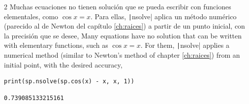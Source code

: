 \begin{paracol}{2}
Muchas ecuaciones no tienen solución que se pueda escribir con funciones elementales, como $\cos x = x$. Para ellas, \texttt|nsolve| aplica un método numérico (parecido al de Newton del capítulo \ref{ch:raices}) a partir de un punto inicial, con la precisión que se desee,
\switchcolumn
Many equations have no solution that can be written with elementary functions, such as $\cos x = x$. For them, \texttt|nsolve| applies a numerical method (similar to Newton's method of chapter \ref{ch:raices}) from an initial point, with the desired accuracy,
\end{paracol}
\begin{verbatim}
print(sp.nsolve(sp.cos(x) - x, x, 1))
\end{verbatim}
\begin{verbatim}
0.739085133215161
\end{verbatim}

